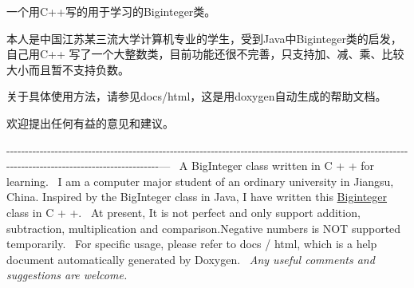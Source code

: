 一个用\+C++写的用于学习的\+Biginteger类。

本人是中国江苏某三流大学计算机专业的学生，受到\+Java中\+Biginteger类的启发，自己用\+C++ 写了一个大整数类，目前功能还很不完善，只支持加、减、乘、比较大小而且暂不支持负数。

关于具体使用方法，请参见docs/html，这是用doxygen自动生成的帮助文档。

欢迎提出任何有益的意见和建议。

-\/-\/-\/-\/-\/-\/-\/-\/-\/-\/-\/-\/-\/-\/-\/-\/-\/-\/-\/-\/-\/-\/-\/-\/-\/-\/-\/-\/-\/-\/-\/-\/-\/-\/-\/-\/-\/-\/-\/-\/-\/-\/-\/-\/-\/-\/-\/-\/-\/-\/-\/-\/-\/-\/-\/-\/-\/-\/-\/-\/-\/-\/-\/-\/-\/-\/-\/-\/-\/-\/-\/-\/-\/-\/-\/-\/-\/-\/-\/-\/-\/-\/-\/-\/-\/-\/-\/-\/-\/-\/-\/-\/-\/-\/-\/-\/-\/-\/-\/-\/-\/-\/-\/-\/-\/-\/-\/-\/-\/-\/-\/-\/-\/-\/-\/-\/-\/-\/-\/-\/-\/-\/-\/-\/-\/-\/-\/-\/-\/-\/-\/-\/-\/-\/-\/-\/-\/-\/-\/-\/-\/-\/-\/-\/-\/-\/-\/-\/-\/---~\newline
 A Big\+Integer class written in C + + for learning.~\newline
 I am a computer major student of an ordinary university in Jiangsu, China. Inspired by the Big\+Integer class in Java, I have written this \mbox{\hyperlink{class_biginteger}{Biginteger}} class in C + +.~\newline
 At present, It is not perfect and only support addition, subtraction, multiplication and comparison.\+Negative numbers is NOT supported temporarily.~\newline
 For specific usage, please refer to docs / html, which is a help document automatically generated by Doxygen.~\newline
 {\itshape Any useful comments and suggestions are welcome.} 
